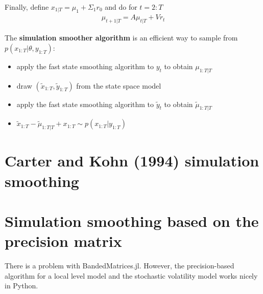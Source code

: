 Finally, define $x_{1|T}=\mu_1 + \Sigma_1 r_0$ and do for $t=2:T$
\begin{align*}
\mu_{t+1|T} = A \mu_{t|T} + V r_t
\end{align*}

The \textbf{simulation smoother algorithm} \citep{bibid} is an efficient way to sample from $p(x_{1:T}|\theta, y_{1:T})$:
\begin{itemize}
	\item apply the fast state smoothing algorithm to $y_t$ to obtain $\mu_{1:T|T}$
	\item draw $(\tilde{x}_{1:T}, \tilde{y}_{1:T})$ from the state space model
	\item apply the fast state smoothing algorithm to $\tilde{y}_t$ to obtain $\tilde{\mu}_{1:T|T}$
	\item $\tilde{x}_{1:T} - \tilde{\mu}_{1:T|T} + x_{1:T} \sim p(x_{1:T}|y_{1:T})$
\end{itemize}

\section{Carter and Kohn (1994) simulation smoothing}


\section{Simulation smoothing based on the precision matrix}

There is a problem with \textsf{BandedMatrices.jl}. However, the precision-based algorithm for a local level model and the stochastic volatility model works nicely in Python.